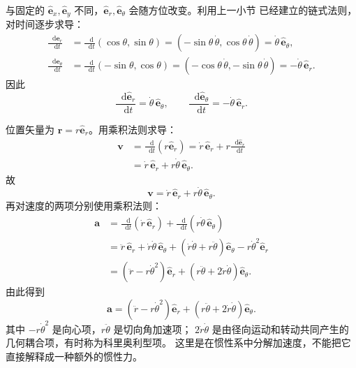 \documentclass[UTF8,zihao=-4,oneside,openany]{ctexbook}
\numberwithin{equation}{section}
\newcommand{\dd}{\mathop{}\!\mathrm{d}}
\newcommand{\vect}[1]{\bm{#1}}
\newcommand{\uvec}[1]{\hat{\vect{#1}}}
\begin{document}
\begin{center}
\end{center}

与固定的 $\uvec e_x,\uvec e_y$ 不同，$\uvec e_r,\uvec e_\theta$ 会随方位改变。利用上一小节
已经建立的链式法则，对时间逐步求导：
\begin{align*}
  \frac{\dd\uvec e_r}{\dd t}
  &=\frac{\dd}{\dd t}(\cos\theta,\sin\theta)
    =(-\sin\theta\,\dot\theta,\cos\theta\,\dot\theta)
    =\dot\theta\,\uvec e_\theta,\\
  \frac{\dd\uvec e_\theta}{\dd t}
  &=\frac{\dd}{\dd t}(-\sin\theta,\cos\theta)
    =(-\cos\theta\,\dot\theta,-\sin\theta\,\dot\theta)
    =-\dot\theta\,\uvec e_r.
\end{align*}
因此
\begin{equation}
  \frac{\dd\uvec e_r}{\dd t}=\dot\theta\,\uvec e_\theta,
  \qquad
  \frac{\dd\uvec e_\theta}{\dd t}=-\dot\theta\,\uvec e_r.
  \label{eq:polar-basis-derivative}
\end{equation}

位置矢量为 $\vect r=r\uvec e_r$。用乘积法则求导：
\begin{align*}
  \vect v
  &=\frac{\dd}{\dd t}(r\uvec e_r)
    =\dot r\,\uvec e_r+r\frac{\dd\uvec e_r}{\dd t}\\
  &=\dot r\,\uvec e_r+r\dot\theta\,\uvec e_\theta.
\end{align*}
故
\begin{equation}
  \vect v=\dot r\,\uvec e_r+r\dot\theta\,\uvec e_\theta.
  \label{eq:polar-velocity}
\end{equation}
再对速度的两项分别使用乘积法则：
\begin{align*}
  \vect a
  &=\frac{\dd}{\dd t}(\dot r\,\uvec e_r)
    +\frac{\dd}{\dd t}(r\dot\theta\,\uvec e_\theta)\\
  &=\ddot r\,\uvec e_r+\dot r\dot\theta\,\uvec e_\theta
    +(\dot r\dot\theta+r\ddot\theta)\uvec e_\theta
    -r\dot\theta^2\uvec e_r\\
  &=(\ddot r-r\dot\theta^2)\uvec e_r
    +(r\ddot\theta+2\dot r\dot\theta)\uvec e_\theta.
\end{align*}
由此得到
\begin{equation}
  \vect a
  =\left(\ddot r-r\dot\theta^2\right)\uvec e_r
  +\left(r\ddot\theta+2\dot r\dot\theta\right)\uvec e_\theta.
  \label{eq:polar-acceleration}
\end{equation}
其中 $-r\dot\theta^2$ 是向心项，$r\ddot\theta$ 是切向角加速项；
$2\dot r\dot\theta$ 是由径向运动和转动共同产生的几何耦合项，有时称为科里奥利型项。
这里是在惯性系中分解加速度，不能把它直接解释成一种额外的惯性力。
\end{document}

